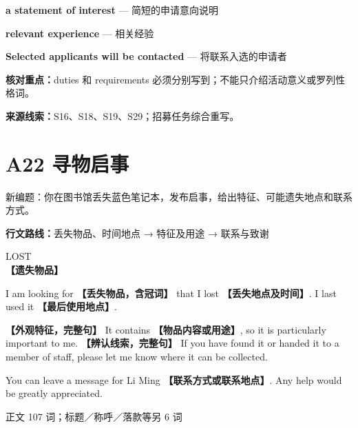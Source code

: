 \documentclass[11pt,a4paper,fontset=macnew]{ctexart}
\newenvironment{writing}{\begingroup\fontsize{10.5}{13.5}\selectfont\setlength{\parskip}{3pt}}{\par\endgroup}
\begin{document}
\par\vspace{4pt}{\bfseries 好词好句：优先记这三处}\par\nopagebreak
{\small\textbf{a statement of interest} — 简短的申请意向说明}\par
{\small\textbf{relevant experience} — 相关经验}\par
{\small\textbf{Selected applicants will be contacted} — 将联系入选的申请者}\par
{\small\textbf{核对重点：}duties 和 requirements 必须分别写到；不能只介绍活动意义或罗列性格词。}\par
{\fontsize{8}{10}\selectfont\textbf{来源线索：}S16、S18、S19、S29；招募任务综合重写。}\par
\clearpage\section*{A22  寻物启事}
{\small 新编题：你在图书馆丢失蓝色笔记本，发布启事，给出特征、可能遗失地点和联系方式。}\par
{\small\textbf{行文路线：}丢失物品、时间地点 → 特征及用途 → 联系与致谢}\par
\par\vspace{4pt}{\bfseries 可替换模板}\par\nopagebreak
\begin{writing}
{\centering LOST\\{\bfseries 【遗失物品】}\par}
I am looking for {\bfseries 【丢失物品，含冠词】} that I lost {\bfseries 【丢失地点及时间】}. I last used it {\bfseries 【最后使用地点】}.

{\bfseries 【外观特征，完整句】} It contains {\bfseries 【物品内容或用途】}, so it is particularly important to me. {\bfseries 【辨认线索，完整句】} If you have found it or handed it to a member of staff, please let me know where it can be collected.

You can leave a message for Li Ming {\bfseries 【联系方式或联系地点】}. Any help would be greatly appreciated.

\par
\end{writing}
\par\vspace{4pt}{\bfseries 完整套用示例}\par\nopagebreak
{\small 正文 107 词；标题／称呼／落款等另 6 词}\par
\end{document}
